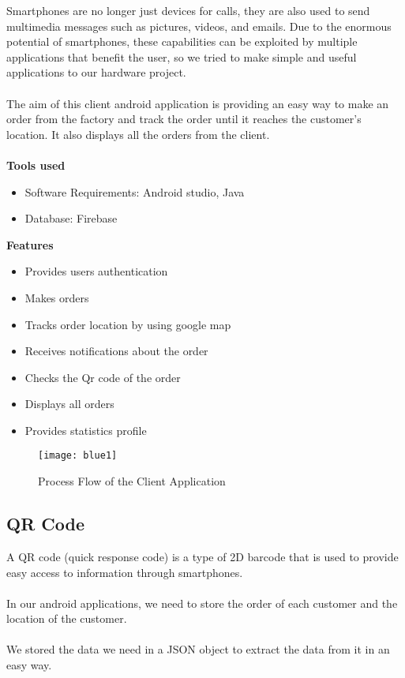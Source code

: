 Smartphones are no longer just devices for calls, they are also used to send multimedia messages such
as pictures, videos, and emails. Due to the enormous potential of smartphones, these capabilities can
be exploited by multiple applications that benefit the user, so we tried to make simple and useful
applications to our hardware project.\\\\
The aim of this client android application is providing an easy way to make an order from the factory
and track the order until it reaches the customer's location. It also displays all the orders from the
client.\\\\

\textbf{Tools used}
\begin{itemize}
    \item Software Requirements: Android studio, Java
    \item Database: Firebase
\end{itemize}
\textbf{Features}
\begin{itemize}
    \item Provides users authentication
    \item Makes orders
    \item Tracks order location by using google map
    \item Receives notifications about the order
    \item Checks the Qr code of the order
    \item Displays all orders
    \item Provides statistics profile
\end{itemize}

\begin{figure}[h]
    \texttt{[image: blue1]}
    \centering
    \caption{Process Flow of the Client Application}
    \label{fig:blue1}
\end{figure}

\subsection{QR Code}
A QR code (quick response code) is a type of 2D barcode that is used to provide easy access to
information through smartphones.\\\\
In our android applications, we need to store the order of each customer and the location of the
customer.\\\\
We stored the data we need in a JSON object to extract the data from it in an easy way.\\\\

